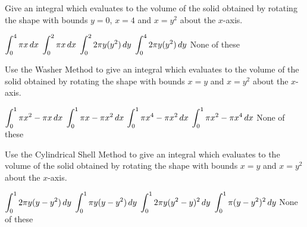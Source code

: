 \documentclass[12pt]{exam}
\newcommand{\ds}{\ensuremath{\displaystyle}}
\begin{document}
\begin{center}
\end{center}
\vspace{0.1in}

\begin{questions}

\setcounter{question}{0}
\question[10]
Give an integral which evaluates to the volume of the solid obtained by
rotating the shape with bounds $y=0$, $x=4$ and $x = y^2$ about the $x$-axis.

\begin{checkboxes}
\CorrectChoice $\ds\int_0^4 \pi x \, dx$
\choice $\ds\int_0^2 \pi x \, dx$
\CorrectChoice $\ds\int_0^2 2\pi y(y^2) \, dy$
\choice $\ds\int_0^4 2\pi y(y^2) \, dy$
\choice None of these
\end{checkboxes}

\vfill

\question[10]
Use the Washer Method to give an integral which evaluates to the volume of
the solid obtained by rotating the shape with bounds $x = y$ and $x = y^2$
about the $x$-axis.

\begin{checkboxes}
\choice $\ds\int_0^1 \pi x^2 - \pi x \, dx$
\CorrectChoice $\ds\int_0^1 \pi x - \pi x^2 \, dx$
\choice $\ds\int_0^1 \pi x^4 - \pi x^2 \, dx$
\choice $\ds\int_0^1 \pi x^2 - \pi x^4 \, dx$
\choice None of these
\end{checkboxes}

\vfill

\question[10]
Use the Cylindrical Shell Method to give an integral which evaluates to the
volume of the
solid obtained by rotating the shape with bounds $x = y$ and $x = y^2$
about the $x$-axis.

\begin{checkboxes}
\CorrectChoice $\ds\int_0^1 2\pi y(y-y^2) \, dy$
\choice $\ds\int_0^1 \pi y(y-y^2) \, dy$
\choice $\ds\int_0^1 2\pi y(y^2-y)^2 \, dy$
\choice $\ds\int_0^1 \pi (y-y^2)^2 \, dy$
\choice None of these
\end{checkboxes}

\vfill

\end{questions}
\end{document}
